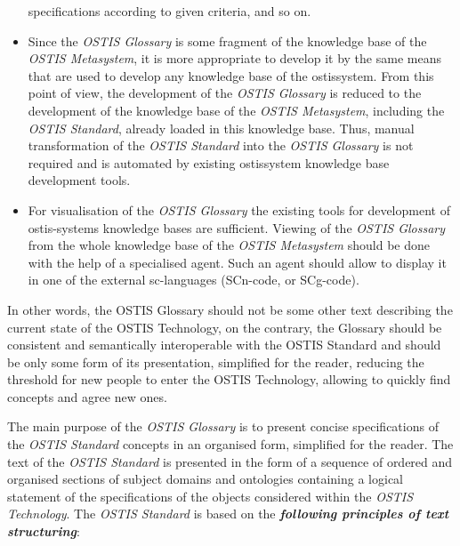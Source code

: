 \documentclass[10 pt]{extarticle}
\begin{document}
\begin{multicols}{2}
\begin{itemize}
specifications according to given criteria, and so on.
    \item  Since the \textit{OSTIS Glossary} is some fragment of the
knowledge base of the \textit{OSTIS Metasystem}, it is more
appropriate to develop it by the same means that
are used to develop any knowledge base of the ostissystem. From this point of view, the development of
the \textit{OSTIS Glossary} is reduced to the development
of the knowledge base of the \textit{OSTIS Metasystem},
including the \textit{OSTIS Standard}, already loaded in
this knowledge base. Thus, manual transformation
of the \textit{OSTIS Standard} into the \textit{OSTIS Glossary}
is not required and is automated by existing ostissystem knowledge base development tools.
    \item  For visualisation of the \textit{OSTIS Glossary} the existing
tools for development of ostis-systems knowledge
bases are sufficient. Viewing of the \textit{OSTIS Glossary}
from the whole knowledge base of the \textit{OSTIS Metasystem} should be done with the help of a specialised
agent. Such an agent should allow to display it in
one of the external sc-languages (SCn-code, or SCg-code).
\end{itemize}

\setlength{\parskip}{3 pt}

In other words, the OSTIS Glossary should not be
some other text describing the current state of the OSTIS
Technology, on the contrary, the Glossary should be
consistent and semantically interoperable with the OSTIS
Standard and should be only some form of its presentation, simplified for the reader, reducing the threshold for
new people to enter the OSTIS Technology, allowing to
quickly find concepts and agree new ones. \break

\setlength{\parskip}{0 pt}

 \break

The main purpose of the \textit{OSTIS Glossary} is to present
concise specifications of the \textit{OSTIS Standard} concepts
in an organised form, simplified for the reader. The text
of the \textit{OSTIS Standard} is presented in the form of a
sequence of ordered and organised sections of subject
domains and ontologies containing a logical statement
of the specifications of the objects considered within the
\textit{OSTIS Technology}. The \textit{OSTIS Standard} is based on the
\textbf{\textit{following principles of text structuring}}:


\end{multicols}
\end{document}

